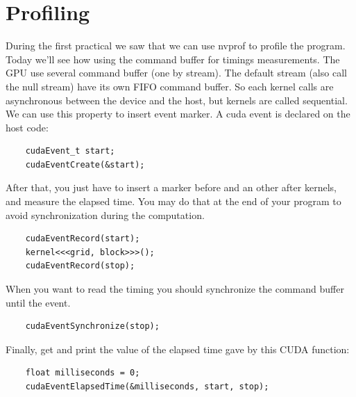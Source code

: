 \documentclass{article}
\begin{document}
\section{Profiling}
During the first practical we saw that we can use nvprof to profile the program. Today we'll see how using the command buffer for timings measurements. The GPU use several command buffer (one by stream). The default stream (also call the null stream) have its own FIFO command buffer. So each kernel calls are asynchronous between the device and the host, but kernels are called sequential. We can use this property to insert event marker. A cuda event is declared on the host code:
\begin{lstlisting}
	cudaEvent_t start;
	cudaEventCreate(&start);
\end{lstlisting}
After that, you just have to insert a marker before and an other after kernels, and measure the elapsed time. You may do that at the end of your program to avoid synchronization during the computation.
\begin{lstlisting}
	cudaEventRecord(start);
	kernel<<<grid, block>>>();
	cudaEventRecord(stop);
\end{lstlisting}
When you want to read the timing you should synchronize the command buffer until the event.
\begin{lstlisting}
	cudaEventSynchronize(stop);
\end{lstlisting}
Finally, get and print the value of the elapsed time gave by this CUDA function:
\begin{lstlisting}
	float milliseconds = 0;
	cudaEventElapsedTime(&milliseconds, start, stop);
\end{lstlisting}
\end{document}
